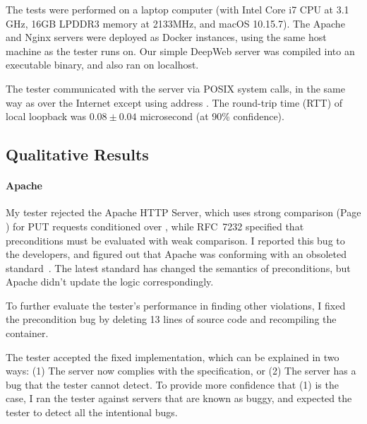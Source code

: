 The tests were performed on a laptop computer (with Intel Core i7 CPU at 3.1
GHz, 16GB LPDDR3 memory at 2133MHz, and macOS 10.15.7).  The Apache and Nginx
servers were deployed as Docker instances, using the same host machine as the
tester runs on.  Our simple DeepWeb server was compiled into an executable
binary, and also ran on localhost.

The tester communicated with the server via POSIX system calls, in the same way
as over the Internet except using address .  The round-trip
time (RTT) of local loopback was $0.08\pm0.04$ microsecond (at 90\% confidence).

\subsection{Qualitative Results}
\label{sec:http-qual}
\paragraph{Apache}
My tester rejected the Apache HTTP Server, which uses strong comparison
(Page \pageref{foot:etag}) for PUT requests conditioned
over , while RFC~7232 specified that
 preconditions must be evaluated with weak comparison.  I
reported this bug to the developers, and figured out that Apache was conforming
with an obsoleted \http standard~\cite{rfc2616}.  The latest standard has
changed the semantics of  preconditions, but Apache
didn't update the logic correspondingly.

To further evaluate the tester's performance in finding other violations, I
fixed the precondition bug by deleting 13 lines of source code and recompiling
the container.

The tester accepted the fixed implementation, which can be explained in two
ways: (1) The server now complies with the specification, or (2) The server has
a bug that the tester cannot detect.  To provide more confidence that (1) is the
case, I ran the tester against servers that are known as buggy, and expected the
tester to detect all the intentional bugs.

